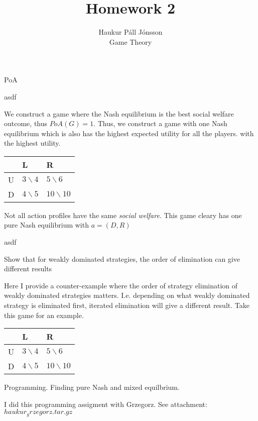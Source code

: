 \documentclass[12pt]{article}
\newenvironment{question}[2][Question]{\begin{trivlist}
\item[\hskip \labelsep {\bfseries #1}\hskip \labelsep {\bfseries #2.}]}{\end{trivlist}}
\newenvironment{answer}[2][Answer]{\begin{trivlist}
\item[\hskip \labelsep {\bfseries #1}\hskip \labelsep {\bfseries #2:}]}{\end{trivlist}}
\begin{document}
\let\oldsum\sum
\renewcommand{\sum}[3]{\oldsum\limits_{#1}^{#2}#3}

\title{Homework 2}
\author{Haukur Páll Jónsson\\
Game Theory}

\maketitle

\begin{question}{1}
PoA
\end{question}
\begin{answer}{a)}
asdf
\end{answer}
\begin{answer}{b)}
We construct a game where the Nash equilibrium is the best social welfare outcome, thus $PoA(G)=1$. Thus, we construct a game with one Nash equilibrium which is also has the highest expected utility for all the players. with the highest utility.

\begin{table}[h]
    \begin{tabular}{|l|l|l|}
    \hline
    ~ & L            & R              \\ \hline
    U & $3\backslash 4$ & $5\backslash 6$   \\ \hline
    D & $4\backslash 5$ & $10\backslash 10$ \\ \hline
    \end{tabular}
\end{table}

Not all action profiles have the same \textit{social welfare}.
This game cleary has one pure Nash equilibrium with $a=(D,R)$

\end{answer}
\begin{answer}{c)}
asdf
\end{answer}
\begin{question}{2}
Show that for weakly dominated strategies, the order of elimination can give different results
\end{question}
\begin{answer}{a)}
Here I provide a counter-example where the order of strategy elimination of weakly dominated strategies matters. I.e. depending on what weakly dominated strategy is eliminated first, iterated elimination will give a different result. Take this game for an example.

\begin{table}[h]
    \begin{tabular}{|l|l|l|}
    \hline
    ~ & L            & R              \\ \hline
    U & $3\backslash 4$ & $5\backslash 6$   \\ \hline
    D & $4\backslash 5$ & $10\backslash 10$ \\ \hline
    \end{tabular}
\end{table}

\end{answer}

\begin{question}{4}
Programming. Finding pure Nash and mixed equilbrium.
\end{question}
\begin{answer}{a)}
I did this programming assigment with Grzegorz.
See attachment: $haukur_grzegorz.tar.gz$
\end{answer}
\end{document}
